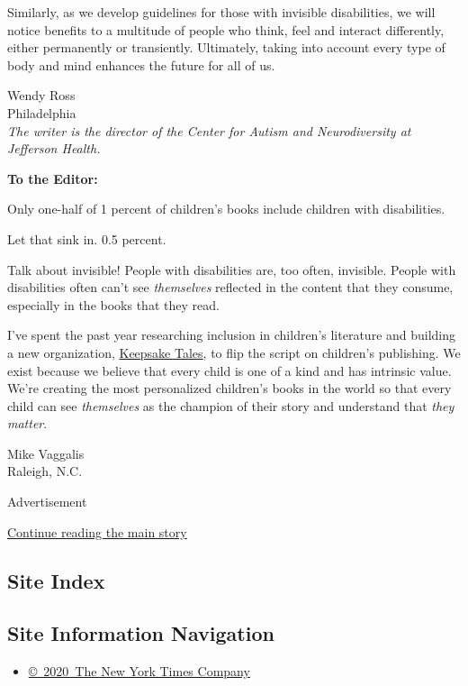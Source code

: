 Similarly, as we develop guidelines for those with invisible
disabilities, we will notice benefits to a multitude of people who
think, feel and interact differently, either permanently or transiently.
Ultimately, taking into account every type of body and mind enhances the
future for all of us.

Wendy Ross\\
Philadelphia\\
\emph{The writer is the director of the Center for Autism and
Neurodiversity at Jefferson Health.}

\textbf{To the Editor:}

Only one-half of 1 percent of children's books include children with
disabilities.

Let that sink in. 0.5 percent.

Talk about invisible! People with disabilities are, too often,
invisible. People with disabilities often can't see \emph{themselves}
reflected in the content that they consume, especially in the books that
they read.

I've spent the past year researching inclusion in children's literature
and building a new organization,
\href{https://mykeepsaketales.com/}{Keepsake Tales}, to flip the script
on children's publishing. We exist because we believe that every child
is one of a kind and has intrinsic value. We're creating the most
personalized children's books in the world so that every child can see
\emph{themselves} as the champion of their story and understand that
\emph{they matter}.

Mike Vaggalis\\
Raleigh, N.C.

Advertisement

\protect\hyperlink{after-bottom}{Continue reading the main story}

\hypertarget{site-index}{%
\subsection{Site Index}\label{site-index}}

\hypertarget{site-information-navigation}{%
\subsection{Site Information
Navigation}\label{site-information-navigation}}

\begin{itemize}
\tightlist
\item
  \href{https://help.nytimes3xbfgragh.onion/hc/en-us/articles/115014792127-Copyright-notice}{©~2020~The
  New York Times Company}
\end{itemize}


